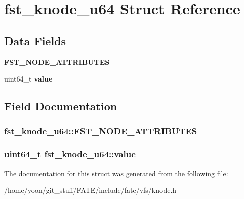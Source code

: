 \hypertarget{structfst__knode__u64}{\section{fst\-\_\-knode\-\_\-u64 Struct Reference}
\label{structfst__knode__u64}
}
\subsection*{Data Fields}
\begin{DoxyCompactItemize}
\item 
\hypertarget{structfst__knode__u64_a94a8d554e494eb7106be13ee3fb4071d}{{\bfseries F\-S\-T\-\_\-\-N\-O\-D\-E\-\_\-\-A\-T\-T\-R\-I\-B\-U\-T\-E\-S}}\label{structfst__knode__u64_a94a8d554e494eb7106be13ee3fb4071d}

\item 
\hypertarget{structfst__knode__u64_a52d9c148be4feb4ef6b1e818590695f9}{uint64\-\_\-t {\bfseries value}}\label{structfst__knode__u64_a52d9c148be4feb4ef6b1e818590695f9}

\end{DoxyCompactItemize}


\subsection{Field Documentation}
\hypertarget{structfst__knode__u64_a94a8d554e494eb7106be13ee3fb4071d}{
\subsubsection[{F\-S\-T\-\_\-\-N\-O\-D\-E\-\_\-\-A\-T\-T\-R\-I\-B\-U\-T\-E\-S}]{\setlength{\rightskip}{0pt plus 5cm}fst\-\_\-knode\-\_\-u64\-::\-F\-S\-T\-\_\-\-N\-O\-D\-E\-\_\-\-A\-T\-T\-R\-I\-B\-U\-T\-E\-S}}\label{structfst__knode__u64_a94a8d554e494eb7106be13ee3fb4071d}
\hypertarget{structfst__knode__u64_a52d9c148be4feb4ef6b1e818590695f9}{
\subsubsection[{value}]{\setlength{\rightskip}{0pt plus 5cm}uint64\-\_\-t fst\-\_\-knode\-\_\-u64\-::value}}\label{structfst__knode__u64_a52d9c148be4feb4ef6b1e818590695f9}


The documentation for this struct was generated from the following file\-:\begin{DoxyCompactItemize}
\item 
/home/yoon/git\-\_\-stuff/\-F\-A\-T\-E/include/fate/vfs/knode.\-h\end{DoxyCompactItemize}

